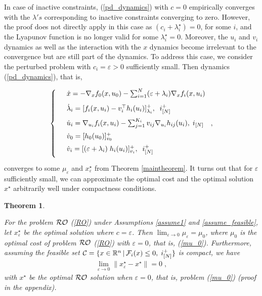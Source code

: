 \documentclass[journal,twoside,web]{ieeecolor}
\newtheorem{theorem}{Theorem}
\begin{document}
In case of inactive constraints, (\ref{pd_dynamics}) with $c=0$ empirically converges with the $\lambda's$ corresponding to inactive constraints converging to zero. However, the proof does not directly apply in this case as $(c_i+\lambda_i^\star)=0$, for some $i$, and the Lyapunov function is no longer valid for some $\lambda_i^\star=0$. Moreover, the $u_i$ and $v_i$ dynamics as well as the interaction with the $x$ dynamics become irrelevant to the convergence but are still part of the dynamics.
To address this case, we consider the perturbed problem with $c_i=\varepsilon>0$ sufficiently small. Then dynamics (\ref{pd_dynamics}), that is,

\begin{align} \label{pd_dynamics_ep}
\left\{
\begin{array}{cl}
\vspace{3mm}
&\dot x=-\nabla_x f_0(x,u_0)- \sum_{i=1}^N(\varepsilon+\lambda_i) \nabla_x f_i(x,u_i)\\
\vspace{2mm}
&\dot \lambda_i=[f_i(x,u_i)-v_i^\top h_i(u_i)]_{\lambda_i}^+,\;\; i^+_{[N]}\\
\vspace{2mm}
&\dot u_i=\nabla_{u_i}f_i(x,u_i)-  \sum_{j=1}^{K_i} v_{ij} \nabla_{u_i} h_{ij}(u_i),\; i_{[N]}\\
\vspace{2mm}
&\dot{v}_0=[h_0(u_0)]_{v_0}^+\\
\vspace{2mm}
&\dot v_i=[(\varepsilon+\lambda_i) \; h_i(u_i)]_{v_i}^+,\;\;i^+_{[N]}
\end{array}\right.,
\end{align}
converges to some $\mu_{\varepsilon}$ and $x^\star_{\varepsilon}$ from Theorem \ref{maintheorem}. It turns out that for $\varepsilon$ sufficiently small, we can approximate the optimal cost and the optimal solution $x^\star$ arbitrarily well under compactness conditions.

\begin{theorem} \label{RO_ROperturbed}

For the problem ${\cal RO}$ (\ref{RO}) under Assumptions \ref{assume1} and \ref{assume_feasible}, let $x^\star_\varepsilon$ be the optimal solution where $c=\varepsilon$. Then
$\displaystyle\lim_{\varepsilon \to 0}\mu_\varepsilon=\mu_0$, where $\mu_0$ is the optimal cost of problem ${\cal RO}$ (\ref{RO}) with $\varepsilon=0$, that is, (\ref{mu_0}). Furthermore, assuming the feasible set ${\cal C}=\{x\in \mathbb{R}^n\,|\,{\cal F}_i(x)\leq 0,\; i^+_{[N]}\}$ is compact, we have
\begin{align*}
\displaystyle\lim_{\varepsilon \to 0} \parallel x_\varepsilon^\star-x^\star \parallel=0\;,
\end{align*}
with $x^\star$ be the optimal ${\cal RO}$ solution when $\varepsilon=0$, that is, problem (\ref{mu_0}) (proof in the appendix).
\end{theorem}
\end{document}
